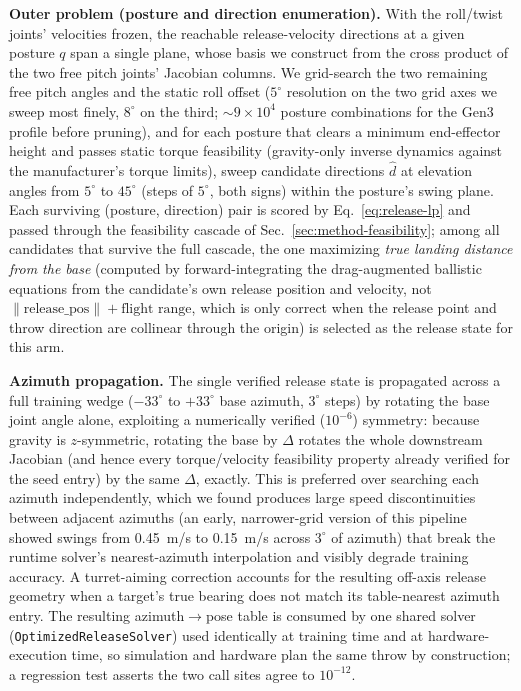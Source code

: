 \documentclass[conference]{IEEEtran}
\begin{document}
\textbf{Outer problem (posture and direction enumeration).} With the
roll/twist joints' velocities frozen, the reachable release-velocity
directions at a given posture $q$ span a single plane, whose basis we
construct from the cross product of the two free pitch joints' Jacobian
columns. We grid-search the two remaining free pitch angles and the static
roll offset ($5^\circ$ resolution on the two grid axes we sweep most
finely, $8^\circ$ on the third; $\sim\!9\times10^4$ posture combinations
for the Gen3 profile before pruning), and for each posture that clears a
minimum end-effector height and passes static torque feasibility
(gravity-only inverse dynamics against the manufacturer's torque limits),
sweep candidate directions $\hat d$ at elevation angles from $5^\circ$ to
$45^\circ$ (steps of $5^\circ$, both signs) within the posture's swing
plane. Each surviving (posture, direction) pair is scored by
Eq.~\eqref{eq:release-lp} and passed through the feasibility cascade of
Sec.~\ref{sec:method-feasibility}; among all candidates that survive the
full cascade, the one maximizing \emph{true landing distance from the base}
(computed by forward-integrating the drag-augmented ballistic equations
from the candidate's own release position and velocity, not
$\lVert\text{release\_pos}\rVert + \text{flight range}$, which is only
correct when the release point and throw direction are collinear through
the origin) is selected as the release state for this arm.

\textbf{Azimuth propagation.} The single verified release state is
propagated across a full training wedge ($-33^\circ$ to $+33^\circ$ base
azimuth, $3^\circ$ steps) by rotating the base joint angle alone, exploiting
a numerically verified ($10^{-6}$) symmetry: because gravity is
$z$-symmetric, rotating the base by $\Delta$ rotates the whole downstream
Jacobian (and hence every torque/velocity feasibility property already
verified for the seed entry) by the same $\Delta$, exactly. This is
preferred over searching each azimuth independently, which we found
produces large speed discontinuities between adjacent azimuths (an
early, narrower-grid version of this pipeline showed swings from
0.45~m/s to 0.15~m/s across $3^\circ$ of azimuth) that break the runtime
solver's nearest-azimuth interpolation and visibly degrade training
accuracy. A turret-aiming correction accounts for the resulting off-axis
release geometry when a target's true bearing does not match its
table-nearest azimuth entry. The resulting azimuth$\to$pose table is
consumed by one shared solver (\texttt{OptimizedReleaseSolver}) used
identically at training time and at hardware-execution time, so simulation
and hardware plan the same throw by construction; a regression test
asserts the two call sites agree to $10^{-12}$.
\end{document}

